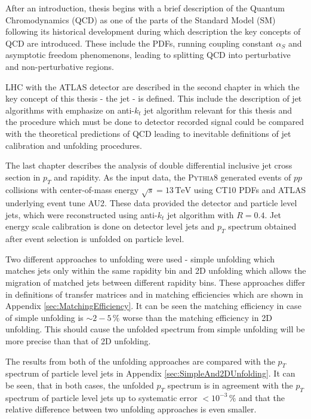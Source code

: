 \documentclass[a4paper,11pt,twoside,openright]{book}
\newcommand{\TeV}{\,\text{TeV}}
\newcommand{\pt}{p_{T}}
\begin{document}
After an introduction, thesis begins with a brief description of the Quantum
Chromodynamics (QCD) as one of the parts of the Standard Model (SM) following
its historical development during which description the key concepts of QCD are
introduced.  These include the PDFs, running coupling constant $\alpha_S$ and
asymptotic freedom phenomenons, leading to splitting QCD into perturbative and
non-perturbative regions. 

LHC with the ATLAS detector are described in the second chapter in which the key
concept of this thesis - the jet - is defined. This include the description of
jet algorithms with emphasize on anti-$k_t$ jet algorithm relevant for this
thesis and the procedure which must be done to detector recorded signal
could be compared with the theoretical predictions of QCD leading to inevitable
definitions of jet calibration and unfolding procedures. 

The last chapter describes the analysis of double differential inclusive jet
cross section in $\pt$ and rapidity. As the input data, the
\textsc{Pythia8} generated events of $pp$ collisions with center-of-mass energy
$\sqrt{s}=13\TeV$ using CT10 PDFs and ATLAS underlying event tune AU2.
These data provided the detector and particle level jets, which were
reconstructed using anti-$k_t$ jet algorithm with $R=0.4$. Jet energy scale
calibration is done on detector level jets and $\pt$ spectrum obtained after
event selection is unfolded on particle level.

Two different approaches to unfolding were used - simple unfolding which matches
jets only within the same rapidity bin and 2D unfolding which allows the
migration of matched jets between different rapidity bins. These approaches
differ in definitions of transfer matrices and in matching efficiencies which
are shown in Appendix \ref{sec:MatchingEfficiency}. It can be seen the matching
efficiency in case of simple unfolding is $\sim 2-5\,\%$ worse than the matching
efficiency in 2D unfolding. This should cause the unfolded spectrum from simple
unfolding will be more precise than that of 2D unfolding.

The results from both of the unfolding approaches are compared with the $\pt$
spectrum of particle level jets in Appendix \ref{sec:SimpleAnd2DUnfolding}. It
can be seen, that in both cases, the unfolded $\pt$ spectrum is in agreement
with the $\pt$ spectrum of particle level jets up to systematic error $<
10^{-3}\,\%$ and that the relative difference between two unfolding approaches
is even smaller.
\end{document}
